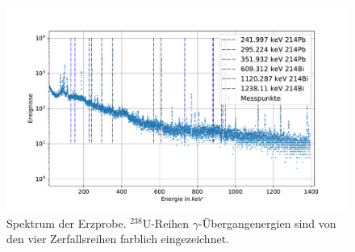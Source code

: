 \documentclass[
	a4paper,
	12pt,
	pagesize,
	ngerman
]{scrartcl}
\begin{document}
	\begin{figure}[H]
			\includegraphics[width= 0.8 \linewidth]{img/erz_U-Ra}
			\caption{
			Spektrum der Erzprobe. $^{238}$U-Reihen $\gamma$-Übergangenergien sind von den vier Zerfallsreihen farblich eingezeichnet.
			}
			\label{fg_erz_u_ra}
	\end{figure}
	\printbibliography
\end{document}
